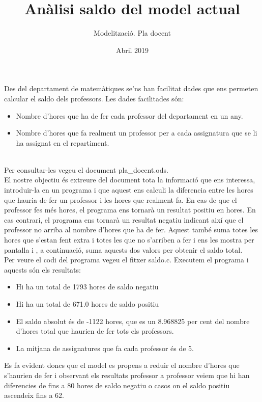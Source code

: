 \documentclass{article}
\title{Anàlisi saldo del model actual}
\author{Modelització. Pla docent}
\date{Abril 2019}
\begin{document}
\maketitle
Des del departament de matemàtiques se'ns han facilitat dades que ens permeten calcular el saldo dels professors. Les dades facilitades són:
\begin{itemize}
    \item Nombre d'hores que ha de fer cada professor del departament en un any.
    \item Nombre d'hores que fa realment un professor per a cada assignatura que se li ha assignat en el repartiment.
\end{itemize}
\\
Per consultar-les vegeu el document pla\_docent.ods.
\\
El nostre objectiu és extreure del document tota la informació que ens interessa, introduir-la  en un programa i que aquest ens calculi la diferencia entre les hores que hauria de fer un professor i les hores que realment fa. En cas de que el professor fes més hores, el programa ens tornarà un resultat positiu en hores. En cas contrari, el programa ens tornarà un resultat negatiu indicant així que el professor no arriba al nombre d'hores que ha de fer. Aquest també suma totes les hores que s'estan fent extra i totes les que no s'arriben a fer i ens les mostra per pantalla i , a continuació, suma aquests dos valors per obtenir el saldo total.
\\
Per veure el codi del programa vegeu el fitxer saldo.c.
Executem el programa i aquests són els resultats:
\begin{itemize}
    \item Hi ha un total de 1793 hores de saldo negatiu
    \item Hi ha un total de 671.0 hores de saldo positiu
    \item El saldo absolut és de -1122 hores, que es un 8.968825 per cent del nombre d'hores total que haurien de fer tots els professors.
    \item La mitjana de assignatures que fa cada professor és de 5.
\end{itemize}
Es fa evident doncs que el model es propens a reduir el nombre d'hores que s'haurien de fer i observant els resultats professor a professor veiem que hi han diferencies de fins a 80 hores de saldo negatiu o casos on el saldo positiu ascendeix fins a 62.
\\
\end{document}
